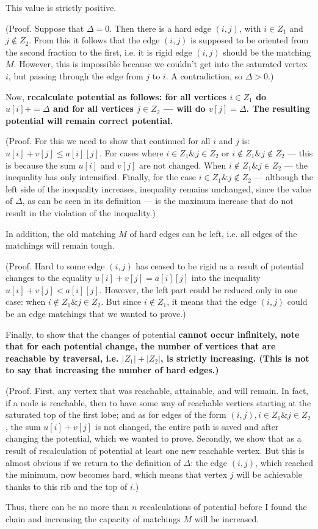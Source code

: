 {This value is strictly positive.

(Proof. Suppose that $\Delta = 0$. Then there is a hard edge $(i,j)$, with $i \in Z_1$ and $j \notin Z_2$. From this it follows that the edge $(i,j)$ is supposed to be oriented from the second fraction to the first, i.e. it is rigid edge $(i,j)$ should be the matching $M$. However, this is impossible because we couldn't get into the saturated vertex $i$, but passing through the edge from $j$ to $i$. A contradiction, so $\Delta > 0$.)

Now, \bf{recalculate potential} as follows: for all vertices $i \in Z_1$ do $u[i] += \Delta$ and for all vertices $j \in Z_2$ --- will do $v[j] = \Delta$. The resulting potential will remain correct potential.

(Proof. For this we need to show that continued for all $i$ and $j$ is: $u[i] + v[j] \le a[i][j]$. For cases where $i \in Z_1 \& j \in Z_2$ or $i \notin Z_1 \& j \notin Z_2$ --- this is because the sum $u[i]$ and $v[j]$ are not changed. When $i \notin Z_1 \& j \in Z_2$ --- the inequality has only intensified. Finally, for the case $i \in Z_1 \& j \notin Z_2$ --- although the left side of the inequality increases, inequality remains unchanged, since the value of $\Delta$, as can be seen in its definition --- is the maximum increase that do not result in the violation of the inequality.)

In addition, the old matching $M$ of hard edges can be left, i.e. all edges of the matchings will remain tough.

(Proof. Hard to some edge $(i,j)$ has ceased to be rigid as a result of potential changes to the equality $u[i] + v[j] = a[i][j]$ into the inequality $u[i] + v[j] < a[i][j]$. However, the left part could be reduced only in one case: when $i \notin Z_1 \& j \in Z_2$. But since $i \notin Z_1$, it means that the edge $(i,j)$ could be an edge matchings that we wanted to prove.)

Finally, to show that the changes of potential \bf{cannot occur infinitely}, note that for each potential change, the number of vertices that are reachable by traversal, i.e. $|Z_1|+|Z_2|$, is strictly increasing. (This is not to say that increasing the number of hard edges.)

(Proof. First, any vertex that was reachable, attainable, and will remain. In fact, if a node is reachable, then to have some way of reachable vertices starting at the saturated top of the first lobe; and as for edges of the form $(i,j), i \in Z_1 \& j \in Z_2$, the sum $u[i] + v[j]$ is not changed, the entire path is saved and after changing the potential, which we wanted to prove. Secondly, we show that as a result of recalculation of potential at least one new reachable vertex. But this is almost obvious if we return to the definition of $\Delta$: the edge $(i,j)$, which reached the minimum, now becomes hard, which means that vertex $j$ will be achievable thanks to this rib and the top of $i$.)

Thus, there can be no more than $n$ recalculations of potential before I found the chain and increasing the capacity of matchings $M$ will be increased.

}

